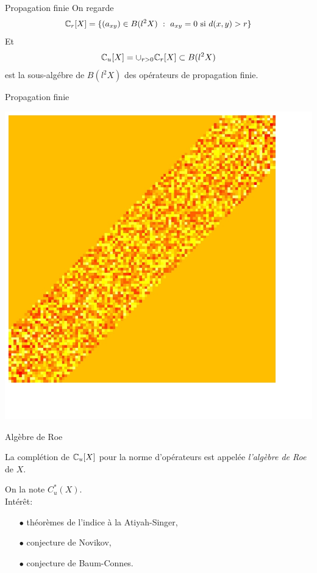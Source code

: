 \begin{frame}{Propagation finie}
On regarde \[\mathbb C_r [X] = \{ (a_{xy})\in B(l^2 X) \ : \ a_{xy }=0 \text{ si } d(x,y)> r\}  \]
Et \[\mathbb C_u[X] = \cup_{r>0} \mathbb C_r[X] \subset B(l^2 X) \]
est la sous-alg\'ebre de $B(l^2 X)$ des op\'erateurs de propagation finie.
\vfill
\end{frame}

\begin{frame}{Propagation finie}
\begin{center}%
\vfill
\includegraphics[width=0.8\linewidth]{finite_propagation}
\vfill
\end{center}%
\end{frame}

\begin{frame}{Alg\`ebre de Roe}
\begin{definition}
La compl\'etion de $\mathbb C_u[X]$ pour la norme d'op\'erateurs est appel\'ee \textit{l'alg\`ebre de Roe} de $X$. 
\end{definition}
\vfill
On la note $C^*_u(X)$.\\
\vfill
Int\'er\^{e}t: 
\begin{itemize}
\item[$\bullet$] th\'eor\`emes de l'indice \`a la Atiyah-Singer,
\item[$\bullet$] conjecture de Novikov,
\item[$\bullet$] conjecture de Baum-Connes.
\end{itemize}
\end{frame}

